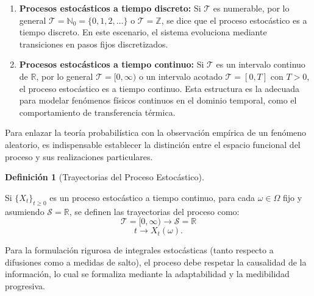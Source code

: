 \documentclass[
  spanish,
  us-letterpaper,
]{scrreprt}
\providecommand{\tightlist}{%
  \setlength{\itemsep}{0pt}\setlength{\parskip}{0pt}}
\numberwithin{equation}{section}
\theoremstyle{plain}
\theoremstyle{plain}
\theoremstyle{plain}
\theoremstyle{definition}
\newtheorem{definition}{Definición}[chapter]
\theoremstyle{remark}
\begin{document}
\begin{enumerate}
\def\labelenumi{\arabic{enumi}.}
\tightlist
\item
  \textbf{Procesos estocásticos a tiempo discreto:} Si \(\mathcal{T}\)
  es numerable, por lo general
  \(\mathcal{T} = \mathbb{N}_0 = \{0, 1, 2, \dots\}\) o
  \(\mathcal{T} = \mathbb{Z}\), se dice que el proceso estocástico es a
  tiempo discreto. En este escenario, el sistema evoluciona mediante
  transiciones en pasos fijos discretizados.
\item
  \textbf{Procesos estocásticos a tiempo continuo:} Si \(\mathcal{T}\)
  es un intervalo continuo de \(\mathbb{R}\), por lo general
  \(\mathcal{T} = [0, \infty)\) o un intervalo acotado
  \(\mathcal{T} = [0, T]\) con \(T > 0\), el proceso estocástico es a
  tiempo continuo. Esta estructura es la adecuada para modelar fenómenos
  físicos continuos en el dominio temporal, como el comportamiento de
  transferencia térmica.
\end{enumerate}

Para enlazar la teoría probabilística con la observación empírica de un
fenómeno aleatorio, es indispensable establecer la distinción entre el
espacio funcional del proceso y sus realizaciones particulares.

\begin{definition}[Trayectorias del Proceso
Estocástico]\protect\hypertarget{def-trayectoria}{}\label{def-trayectoria}

Si \(\{X_t\}_{t \geq 0}\) es un proceso estocástico a tiempo continuo,
para cada \(\omega \in \Omega\) fijo y asumiendo
\(\mathcal{S} = \mathbb{R}\), se definen las trayectorias del proceso
como: \[
    \mathcal{T} = [0, \infty) \rightarrow \mathcal{S} = \mathbb{R}
\] \[
    t \rightarrow X_t(\omega).
\]

\end{definition}

Para la formulación rigurosa de integrales estocásticas (tanto respecto
a difusiones como a medidas de salto), el proceso debe respetar la
causalidad de la información, lo cual se formaliza mediante la
adaptabilidad y la medibilidad progresiva.
\end{document}
